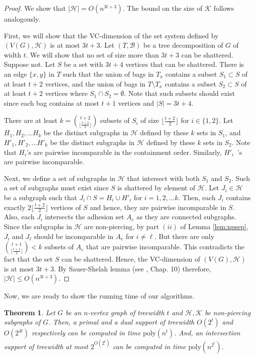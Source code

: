 \documentclass[12pt]{article}
\newcommand{\BB}{\mathcal{B}}
\newcommand{\HH}{\mathcal{H}}
\newcommand{\KK}{\mathcal{K}}
\newcommand{\poly}{\textrm{poly}}
\newtheorem{theorem}{Theorem}
\theoremstyle{case}
\begin{document}
\begin{proof}
We show that $|\HH|=O(n^{3t+3})$.
The bound on the size of $\KK$ follows analogously.

First, we will show that the VC-dimension of the set system defined by $(V(G),\HH)$ is at most $3t+3$.
Let $(T,\BB)$ be a tree decomposition of $G$ of width $t$.
We will show that no set of size more than $3t+3$ can be shattered.
Suppose not. Let $S$ be a set with $3t+4$ vertices that can be shattered.
There is an edge $\{x,y\}$ in $T$ such that the union of bags in $T_x$ contains a subset $S_1\subset S$ of at least $t+2$ vertices, and the union of bags in $T\setminus T_x$ contains a subset $S_2\subset S$ of at least $t+2$ vertices where $S_1\cap S_2=\emptyset$.
Note that such subsets should exist since each bag contains at most $t+1$ vertices and $|S|=3t+4$.

There are at least $k=\binom{t+2}{\lfloor\frac{t+2}{2}\rfloor}$ subsets of $S_i$ of size $\lfloor \frac{t+2}{2}\rfloor$ for $i\in\{1,2\}$.
Let $H_1,H_2,\ldots H_k$ be the distinct subgraphs in $\HH$ defined by these $k$ sets in $S_1$, and $H'_1,H'_2,\ldots H'_k$ be the distinct subgraphs in $\HH$ defined by these $k$ sets in $S_2$.
Note that $H_i$'s are pairwise incomparable in the containment order. Similarly, $H'_i$~'s are pairwise incomparable.

Next, we define a set of subgraphs in $\HH$ that intersect with both $S_1$ and $S_2$.
Such a set of subgraphs must exist since $S$ is shattered by element of $\HH$. 
Let $J_i\in\HH$ be a subgraph such that $J_i\cap S=H_i\cup H'_i$ for $i=1,2,\ldots k$.
Then, each $J_i$ contains exactly $2\lfloor\frac{t+2}{2}\rfloor$ vertices of $S$ and hence, they are pairwise incomparable in $S$.
Also, each $J_i$ intersects the adhesion set $A_e$ as they are connected subgraphs.
Since the subgraphs in $\HH$ are non-piercing, by part $(ii)$ of Lemma \ref{lem:npsep}, $J_i$ and $J_\ell$ should be incomparable in $A_e$ for $i\ne \ell$.
But there are only $\binom{t+1}{\lfloor\frac{t+1}{2}\rfloor}<k$ subsets of $A_e$ that are pairwise incomparable.
This contradicts the fact that the set $S$ can be shattered.
Hence, the VC-dimension of $(V(G),\HH)$ is at most $3t+3$.
By Sauer-Shelah lemma (see \cite{Mat02LecDiscGeom}, Chap. 10)
therefore, $|\HH|\le O(n^{3t+3})$. 
\end{proof}

Now, we are ready to show the running time of our algorithms.

\begin{theorem}\label{thm:runningtime-tw}
Let $G$ be an $n$-vertex graph of treewidth $t$ and $\HH,\KK$ be non-piercing subgraphs of $G$.
Then, a primal and a dual support of treewidth $O(2^t)$ and $O(2^{4t})$ respectively can be computed in time $\poly(n^t)$.
And, an intersection support of treewidth at most $2^{O(2^t)}$ can be computed in time $\poly(n^{2^t})$.
\end{theorem}
\end{document}
